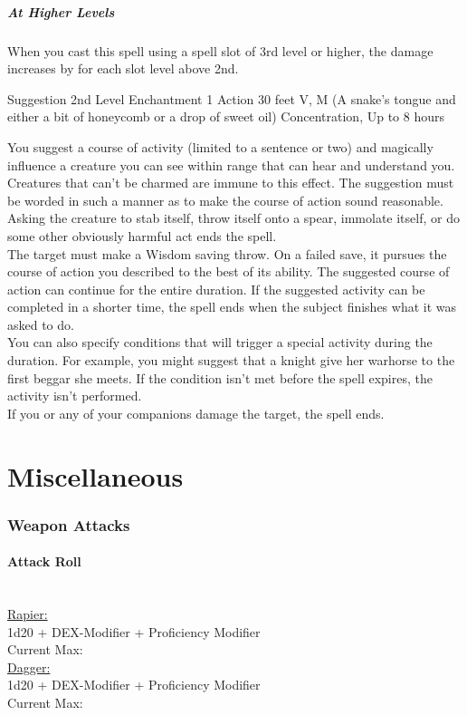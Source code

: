 \documentclass[letterpaper,openany,oneside,twocolumn]{book}
\begin{document}
\subparagraph*{At Higher Levels} When you cast this spell using a spell slot of 3rd level or higher, the damage increases by  for each slot level above 2nd.

\DndSpellHeader
  {Suggestion}
  {2nd Level Enchantment}
  {1 Action}
  {30 feet}
  {V, M (A snake's tongue and either a bit of honeycomb or a drop of sweet oil)}
  {Concentration, Up to 8 hours}

You suggest a course of activity (limited to a sentence or two) and magically influence a creature you can see within range that can hear and understand you. Creatures that can’t be charmed are immune to this effect. The suggestion must be worded in such a manner as to make the course of action sound reasonable. Asking the creature to stab itself, throw itself onto a spear, immolate itself, or do some other obviously harmful act ends the spell.\\
The target must make a Wisdom saving throw. On a failed save, it pursues the course of action you described to the best of its ability. The suggested course of action can continue for the entire duration. If the suggested activity can be completed in a shorter time, the spell ends when the subject finishes what it was asked to do.\\
You can also specify conditions that will trigger a special activity during the duration. For example, you might suggest that a knight give her warhorse to the first beggar she meets. If the condition isn’t met before the spell expires, the activity isn’t performed.\\
If you or any of your companions damage the target, the spell ends.

\section*{Miscellaneous}
\subsubsection*{Weapon Attacks}
\paragraph*{Attack Roll}\hfill\\
\underline{Rapier:}\\
1d20 + DEX-Modifier + Proficiency Modifier\\
\indent Current Max: \\
\underline{Dagger:}\\
1d20 + DEX-Modifier + Proficiency Modifier\\
\indent Current Max: \\
\end{document}
